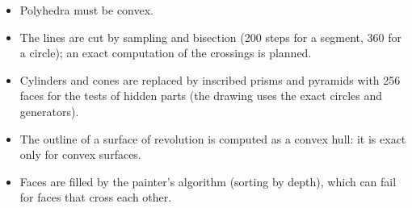 \documentclass[11pt]{article}
\begin{document}
\begin{itemize}
  \item Polyhedra must be convex.
  \item The lines are cut by sampling and bisection (200 steps for a
        segment, 360 for a circle); an exact computation of the crossings
        is planned.
  \item Cylinders and cones are replaced by inscribed prisms and pyramids
        with 256 faces for the tests of hidden parts (the drawing uses the
        exact circles and generators).
  \item The outline of a surface of revolution is computed as a convex hull:
        it is exact only for convex surfaces.
  \item Faces are filled by the painter's algorithm (sorting by depth),
        which can fail for faces that cross each other.
\end{itemize}
\end{document}
